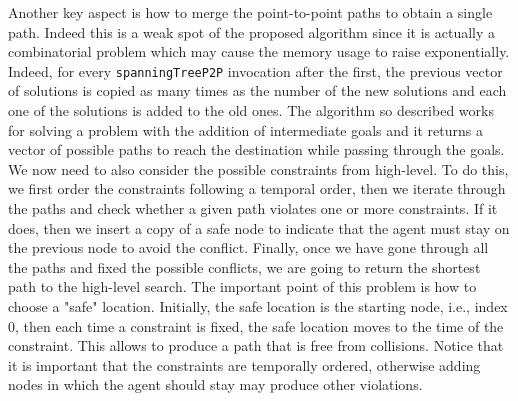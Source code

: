 Another key aspect is how to merge the point-to-point paths to obtain a single
path. Indeed this is a weak spot of the proposed algorithm since it is actually
a combinatorial problem which may cause the memory usage to raise
exponentially. Indeed, for every \texttt{spanningTreeP2P} invocation after the
first, the previous vector of solutions is copied as many times as the number
of the new solutions and each one of the solutions is added to the old ones.
\newline
The algorithm so described works for solving a  problem with the
addition of intermediate goals and it returns a vector of possible paths to
reach the destination while passing through the goals. We now need to also 
consider the possible constraints from high-level. To do this, we first order
the constraints following a temporal order, then we iterate through the paths 
and check whether a given path violates one or more constraints. If it does,
then we insert a copy of a safe node to indicate that the agent must stay on
the previous node to avoid the conflict. Finally, once we have gone through all
the paths and fixed the possible conflicts, we are going to return the shortest
path to the high-level search. \newline
The important point of this problem is how to choose a "safe" location.
Initially, the safe location is the starting node, i.e., index 0, then each
time a constraint is fixed, the safe location moves to the time of the
constraint. This allows to produce a path that is free from collisions. Notice
that it is important that the constraints are temporally ordered, otherwise
adding nodes in which the agent should stay may produce other violations. 
%
